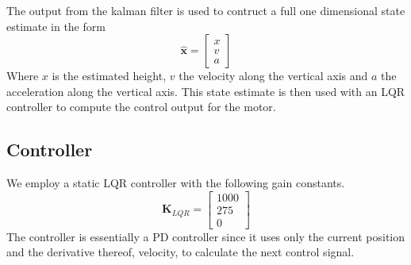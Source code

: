 The output from the kalman filter is used to contruct a full one dimensional state estimate in the form
\begin{equation*}
	\hat{\mathbf{x}} = \begin{bmatrix}
		x \\
		v \\
		a
	\end{bmatrix}
\end{equation*}
Where \(x\) is the estimated height, \(v\) the velocity along the vertical axis and \(a\) the acceleration along the vertical axis. 
This state estimate is then used with an LQR controller to compute the control output for the motor.
\subsection{Controller}\label{sec:controller}
We employ a static LQR controller with the following gain constants.
\begin{equation*}
	\mathbf{K}_{LQR} = \begin{bmatrix}
		1000 \\
		275 \\
		0 
	\end{bmatrix}
\end{equation*}
The controller is essentially a PD controller since it uses only the current position and the derivative thereof, velocity, to calculate
the next control signal.
